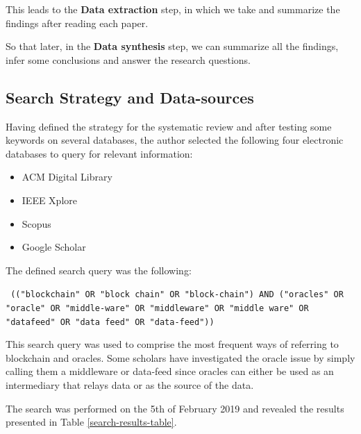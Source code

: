 \documentclass[final,3p,12pt,twocolumn]{elsarticle}
\begin{document}
This leads to the \textbf{Data extraction} step, in which we take and summarize the findings after reading each paper.

So that later, in the \textbf{Data synthesis} step, we can summarize all the findings, infer some conclusions and answer the research questions.

\subsection{Search Strategy and Data-sources}
Having defined the strategy for the systematic review and after testing some keywords on several databases, the author selected the following four electronic databases to query for relevant information:

\begin{itemize}
  \item ACM Digital Library
  \item IEEE Xplore
  \item Scopus
  \item Google Scholar
\end{itemize}

The defined search query was the following:

\texttt{
  (("blockchain" OR "block chain" OR "block-chain")
  AND
  ("oracles" OR "oracle" OR "middle-ware" OR "middleware" OR "middle ware" OR "datafeed" OR "data feed" OR "data-feed"))
}

This search query was used to comprise the most frequent ways of referring to blockchain and oracles. Some scholars have investigated the oracle issue by simply calling them a middleware or data-feed since oracles can either be used as an intermediary that relays data or as the source of the data.

The search was performed on the 5th of February 2019 and revealed the results presented in Table \ref{search-results-table}.

\begin{table}[h]
  \begin{minipage}[c]{\textwidth}
    \centering
    \caption{Number of results and applied filters per database}
    \label{search-results-table}
  \end{minipage}
\end{table}
\end{document}
